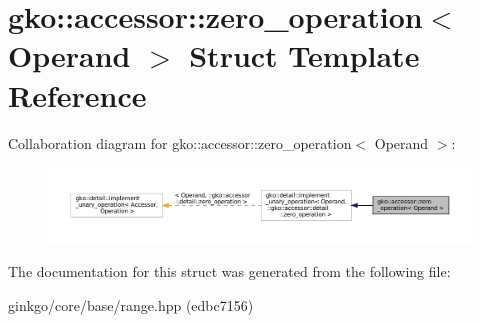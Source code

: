 \hypertarget{structgko_1_1accessor_1_1zero__operation}{}\section{gko\+:\+:accessor\+:\+:zero\+\_\+operation$<$ Operand $>$ Struct Template Reference}
\label{structgko_1_1accessor_1_1zero__operation}


Collaboration diagram for gko\+:\+:accessor\+:\+:zero\+\_\+operation$<$ Operand $>$\+:
\nopagebreak
\begin{figure}[H]
\begin{center}
\leavevmode
\includegraphics[width=350pt]{structgko_1_1accessor_1_1zero__operation__coll__graph}
\end{center}
\end{figure}


The documentation for this struct was generated from the following file\+:\begin{DoxyCompactItemize}
\item 
ginkgo/core/base/range.\+hpp (edbc7156)\end{DoxyCompactItemize}
